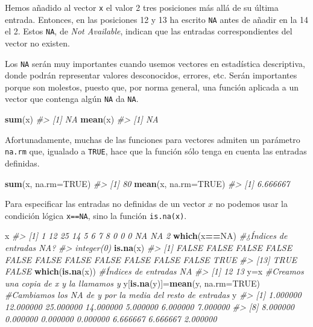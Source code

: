 \documentclass[
]{book}
\newenvironment{Shaded}{\begin{snugshade}}{\end{snugshade}}
\newcommand{\CommentTok}[1]{\textcolor[rgb]{0.56,0.35,0.01}{\textit{#1}}}
\newcommand{\DataTypeTok}[1]{\textcolor[rgb]{0.13,0.29,0.53}{#1}}
\newcommand{\KeywordTok}[1]{\textcolor[rgb]{0.13,0.29,0.53}{\textbf{#1}}}
\newcommand{\NormalTok}[1]{#1}
\newcommand{\OperatorTok}[1]{\textcolor[rgb]{0.81,0.36,0.00}{\textbf{#1}}}
\newcommand{\OtherTok}[1]{\textcolor[rgb]{0.56,0.35,0.01}{#1}}
\theoremstyle{definition}
\theoremstyle{definition}
\theoremstyle{definition}
\theoremstyle{remark}
\begin{document}
Hemos añadido al vector \texttt{x} el valor 2 tres posiciones más allá de su última entrada. Entonces, en las posiciones 12 y 13 ha escrito \texttt{NA} antes de añadir en la 14 el 2. Estos \texttt{NA}, de \emph{Not Available}, indican que las entradas correspondientes del vector no existen.

Los \texttt{NA} serán muy importantes cuando usemos vectores en estadística descriptiva, donde podrán representar valores desconocidos, errores, etc.
Serán importantes porque son molestos, puesto que, por norma general, una función aplicada a un vector que contenga algún \texttt{NA} da \texttt{NA}.

\begin{Shaded}
\begin{Highlighting}[]
\KeywordTok{sum}\NormalTok{(x)}
\CommentTok{\#\textgreater{} [1] NA}
\KeywordTok{mean}\NormalTok{(x)}
\CommentTok{\#\textgreater{} [1] NA}
\end{Highlighting}
\end{Shaded}

Afortunadamente, muchas de las funciones para vectores admiten un parámetro \texttt{na.rm} que, igualado a \texttt{TRUE}, hace que la función sólo tenga en cuenta las entradas definidas.

\begin{Shaded}
\begin{Highlighting}[]
\KeywordTok{sum}\NormalTok{(x, }\DataTypeTok{na.rm=}\OtherTok{TRUE}\NormalTok{)}
\CommentTok{\#\textgreater{} [1] 80}
\KeywordTok{mean}\NormalTok{(x, }\DataTypeTok{na.rm=}\OtherTok{TRUE}\NormalTok{)}
\CommentTok{\#\textgreater{} [1] 6.666667}
\end{Highlighting}
\end{Shaded}

Para especificar las entradas no definidas de un vector \(x\) no podemos usar la condición lógica \texttt{x==NA}, sino la función \texttt{is.na(x)}.

\begin{Shaded}
\begin{Highlighting}[]
\NormalTok{x}
\CommentTok{\#\textgreater{}  [1]  1 12 25 14  5  6  7  8  0  0  0 NA NA  2}
\KeywordTok{which}\NormalTok{(x}\OperatorTok{==}\OtherTok{NA}\NormalTok{) }\CommentTok{\#¿Índices de entradas NA?}
\CommentTok{\#\textgreater{} integer(0)}
\KeywordTok{is.na}\NormalTok{(x)}
\CommentTok{\#\textgreater{}  [1] FALSE FALSE FALSE FALSE FALSE FALSE FALSE FALSE FALSE FALSE FALSE  TRUE}
\CommentTok{\#\textgreater{} [13]  TRUE FALSE}
\KeywordTok{which}\NormalTok{(}\KeywordTok{is.na}\NormalTok{(x))   }\CommentTok{\#Índices de entradas NA}
\CommentTok{\#\textgreater{} [1] 12 13}
\NormalTok{y=x  }\CommentTok{\#Creamos una copia de x y la llamamos y}
\NormalTok{y[}\KeywordTok{is.na}\NormalTok{(y)]=}\KeywordTok{mean}\NormalTok{(y, }\DataTypeTok{na.rm=}\OtherTok{TRUE}\NormalTok{) }\CommentTok{\#Cambiamos los NA de y por la media del resto de entradas}
\NormalTok{y}
\CommentTok{\#\textgreater{}  [1]  1.000000 12.000000 25.000000 14.000000  5.000000  6.000000  7.000000}
\CommentTok{\#\textgreater{}  [8]  8.000000  0.000000  0.000000  0.000000  6.666667  6.666667  2.000000}
\end{Highlighting}
\end{Shaded}
\end{document}
